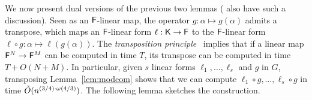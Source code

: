   


We now present dual versions of the previous two lemmas
(\cite{KalSho98} also have such a discussion). Seen as an ${\mathsf{F}}$-linear
map, the operator $g:\alpha \mapsto g(\alpha)$ admits a transpose,
which maps an ${\mathsf{F}}$-linear form $\ell:{\mathsf{K}}\to{\mathsf{F}}$ to the ${\mathsf{F}}$-linear form
$\ell \circ g: \alpha \mapsto \ell(g(\alpha))$.  The {\em
  transposition principle}~\citep{KaKiBs88,CaKaYa89} implies that if a
linear map ${\mathsf{F}}^N \to {\mathsf{F}}^M$ can be computed in time $T$, its transpose
can be computed in time $T+O(N+M)$. In particular, given $s$ linear
forms $\ell_1,\dots,\ell_s$ and $g$ in $G$, transposing
Lemma~\ref{lem:modcom} shows that we can compute $\ell_1 \circ
g,\dots,\ell_s \circ g$ in time $\tilde{O}(n^{(3/4)\cdot \omega(4/3)})$. The following lemma
sketches the construction.

